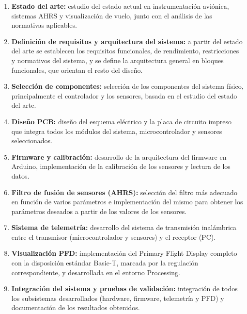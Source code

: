 \begin{enumerate}
    \item \textbf{Estado del arte:} estudio del estado actual en
    instrumentación aviónica, sistemas AHRS y visualización de vuelo, junto con
    el análisis de las normativas aplicables.

    \item \textbf{Definición de requisitos y arquitectura del sistema:} a partir
    del estado del arte se establecen los requisitos funcionales, de rendimiento,
    restricciones y normativos del sistema, y se define la arquitectura general en
    bloques funcionales, que orientan el resto del diseño.

    \item \textbf{Selección de componentes:} selección de los componentes del
    sistema físico, principalmente el controlador y los sensores, basada en el
    estudio del estado del arte.

    \item \textbf{Diseño PCB:} diseño del esquema eléctrico y la placa de
    circuito impreso que integra todos los módulos del sistema, microcontrolador
    y sensores seleccionados.

    \item \textbf{Firmware y calibración:} desarrollo de la arquitectura del
    firmware en Arduino, implementación de la calibración de los sensores y
    lectura de los datos.

    \item \textbf{Filtro de fusión de sensores (AHRS):} selección del filtro más
    adecuado en función de varios parámetros e implementación del mismo para
    obtener los parámetros deseados a partir de los valores de los sensores.

    \item \textbf{Sistema de telemetría:} desarrollo del sistema de transmisión
    inalámbrica entre el transmisor (microcontrolador y sensores) y el receptor
    (PC).

    \item \textbf{Visualización PFD:} implementación del Primary Flight Display
    completo con la disposición estándar Basic-T, marcada por la regulación
    correspondiente, y desarrollada en el entorno Processing.

    \item \textbf{Integración del sistema y pruebas de validación:} integración
    de todos los subsistemas desarrollados (hardware, firmware, telemetría y
    PFD) y documentación de los resultados obtenidos.
\end{enumerate}


